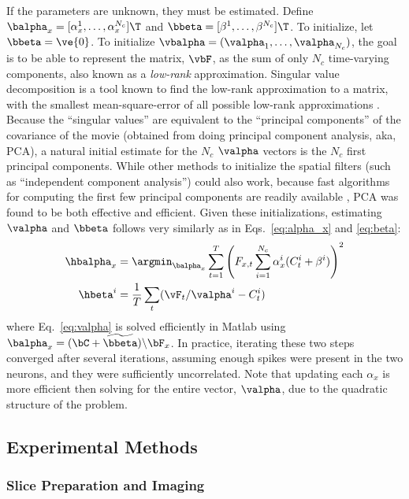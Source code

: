 If the parameters are unknown, they must be estimated. Define $\balpha_x=[\alpha_x^1, \ldots, \alpha_x^{N_c}]\T$ and $\bbeta=[\beta^1, \ldots, \beta^{N_c}]\T$.  To initialize, let $\bbeta=\ve{0}$. To initialize $\vbalpha=(\valpha_1, \ldots, \valpha_{N_c})$, the goal is to be able to represent the matrix, $\vbF$, as the sum of only $N_c$ time-varying components, also known as a \emph{low-rank} approximation.  Singular value decomposition is a tool known to find the low-rank approximation to a matrix, with the smallest mean-square-error of all possible low-rank approximations \cite{HornJohnson90}.  Because the ``singular values'' are equivalent to the ``principal components'' of the covariance of the movie (obtained from doing principal component analysis, aka, PCA), a natural initial estimate for the $N_c$ $\valpha$ vectors is the $N_c$ first principal components.  While other methods to initialize the spatial filters (such as ``independent component analysis'') could also work, because fast algorithms for computing the first few principal components are readily available \cite{RokhlinTygert09}, PCA was found to be both effective and efficient.  Given these initializations, estimating $\valpha$ and $\bbeta$ follows very similarly as in Eqs.~\eqref{eq:alpha_x} and \eqref{eq:beta}:
\begin{align} \label{eq:valpha}
	\hbalpha_x &= \argmin_{\balpha_x} \sum_{t=1}^T  \left(F_{x,t}  \sum_{i=1}^{N_c} \alpha_x^i (C_t^i + \beta^i)\right)^2 \\
	\hbeta^i &= \frac{1}{T}\sum_t (\vF_t / \valpha^i - C_t^i) \label{eq:vbeta}
\end{align}
where Eq.~\eqref{eq:valpha} is solved efficiently in Matlab using $\balpha_x = (\bC + \widetilde{\bbeta})\backslash \bF_x$.  In practice, iterating these two steps converged after several iterations, assuming enough spikes were present in the two neurons, and they were sufficiently uncorrelated.  Note that updating each $\alpha_x$ is more efficient then solving for the entire vector, $\valpha$, due to the quadratic structure of the problem.








\subsection{Experimental Methods} \label{sec:exp}

\subsubsection{Slice Preparation and Imaging} 

